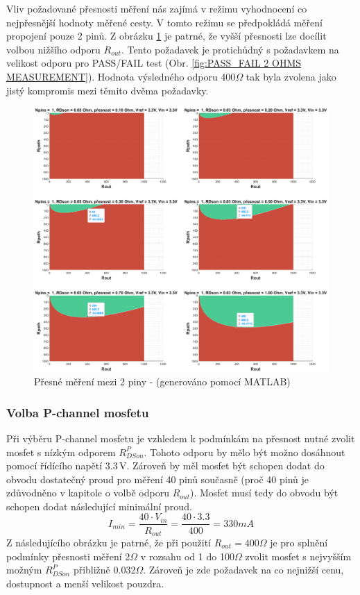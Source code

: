 \clearpage
Vliv požadované přesnosti měření nás zajímá v režimu vyhodnocení co nejpřesnější hodnoty měřené cesty.
V tomto režimu se předpokládá měření propojení pouze 2 pinů.
Z obrázku \ref{fig:One pin MEASUREMENT} je patrné, že vyšší přesnosti lze docílit volbou nižšího odporu $R_{out}$.
Tento požadavek je protichůdný s požadavkem na velikost odporu pro PASS/FAIL test (Obr. \ref{fig:PASS_FAIL 2 OHMS MEASUREMENT}).
Hodnota výsledného odporu 400$\Omega$ tak byla zvolena jako jistý kompromis mezi těmito dvěma požadavky.

\begin{figure}[ht!]
\centering
\includegraphics[width = 1\textwidth]{obrazky/MERENI_JEDNOHO_PINU.eps}
\caption{Přesné měření mezi 2 piny - (generováno pomocí MATLAB)}
\label{fig:One pin MEASUREMENT}
\end{figure}
\clearpage



\subsubsection{Volba P-channel mosfetu}
Při výběru P-channel mosfetu je vzhledem k podmínkám na přesnost nutné zvolit mosfet s nízkým odporem $R^P_{DSon}$.
Tohoto odporu by mělo být možno dosáhnout pomocí řídícího napětí 3.3\,V.
Zároveň by měl mosfet být schopen dodat do obvodu dostatečný proud pro měření 40 pinů současně (proč 40 pinů je zdůvodněno v kapitole
o volbě odporu $R_{out}$). Mosfet musí tedy do obvodu být schopen dodat následující minimální proud.
\begin{equation} \label{eq:MIN_CURRENT}
I_{min} = \frac{40 \cdot V_{in}}{R_{out}} = \frac{40 \cdot 3.3}{400} = 330mA
\end{equation}
Z následujícího obrázku je patrné, že při použití $R_{out} = 400\Omega$
je pro splnění podmínky přesnosti měření 2$\Omega$ v rozsahu od 1 do 100$\Omega$ zvolit mosfet s
nejvyšším možným $R^P_{DSon}$ přibližně 0.032$\Omega$. Zároveň je zde požadavek na co nejnižší cenu, dostupnost a menší velikost pouzdra. 

